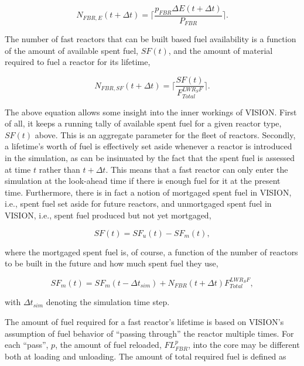 \begin{equation*}
N_{FBR,E}\left(t+\Delta t\right) = 
                        \lceil \frac{p_{FBR} \Delta E (t + \Delta t)}
                                    {P_{FBR}} \rceil .
\end{equation*}

The number of fast reactors that can be built based fuel availability is a
function of the amount of available spent fuel, $SF(t)$, and the amount
of material required to fuel a reactor for its lifetime,

\begin{equation*}
N_{FBR,SF}\left(t+\Delta t\right) = 
                        \lceil \frac{SF(t)}
                                    {F^{LWR_SF}_{Total}} \rceil .
\end{equation*}

The above equation allows some insight into the inner workings of VISION. First
of all, it keeps a running tally of available spent fuel for a given reactor
type, $SF(t)$ above. This is an aggregate parameter for the fleet of
reactors. Secondly, a lifetime's worth of fuel is effectively set aside whenever
a reactor is introduced in the simulation, as can be insinuated by the fact that
the spent fuel is assessed at time $t$ rather than $t + \Delta t$. This means
that a fast reactor can only enter the simulation at the look-ahead time if there
is enough fuel for it at the present time. Furthermore, there is in fact a
notion of mortgaged spent fuel in VISION, i.e., spent fuel set aside for future
reactors, and unmortgaged spent fuel in VISION, i.e., spent fuel produced but
not yet mortgaged,

\begin{equation*}
SF(t) = SF_u(t) - SF_m(t),
\end{equation*}

where the mortgaged spent fuel is, of course, a function of the number of
reactors to be built in the future and how much spent fuel they use,

\begin{equation*}
SF_m(t) = SF_m(t - \Delta t_{sim}) + N_{FBR}(t + \Delta t) F^{LWR_SF}_{Total},
\end{equation*}

with $\Delta t_{sim}$ denoting the simulation time step.

The amount of fuel required for a fast reactor's lifetime is based on VISION's
assumption of fuel behavior of ``passing through'' the reactor multiple
times. For each ``pass'', $p$, the amount of fuel reloaded, $FL^p_{FBR}$, into
the core may be different both at loading and unloading. The amount of total
required fuel is defined as

